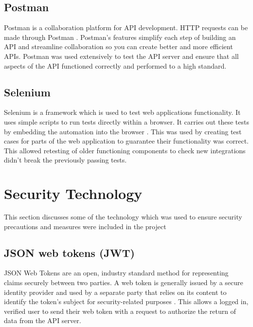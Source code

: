 \subsection{Postman}
Postman is a collaboration platform for API development. HTTP requests can be made through Postman \cite{soniapi}. Postman's features simplify each step of building an API and streamline collaboration so you can create better and more efficient APIs. Postman was used extensively to test the API server and ensure that all aspects of the API functioned correctly and performed to a high standard.

\subsection{Selenium}
Selenium is a framework which is used to test web applications functionality. It uses simple scripts to run tests directly within a browser. It carries out these tests by embedding the automation into the browser \cite{holmes2006automating}. This was used by creating test cases for parts of the web application to guarantee their functionality was correct. This allowed retesting of older functioning components to check new integrations didn't break the previously passing tests.

\section{Security Technology}
This section discusses some of the technology which was used to ensure security precautions and measures were included in the project

\subsection{JSON web tokens (JWT)}
JSON Web Tokens are an open, industry standard method for representing claims securely between two parties. A web token is generally issued by a secure identity provider and used by a separate party that relies on its content to identify the token's subject for security-related purposes \cite{jones2015json}. This allows a logged in, verified user to send their web token with a request to authorize the return of data from the API server.
\newpage
